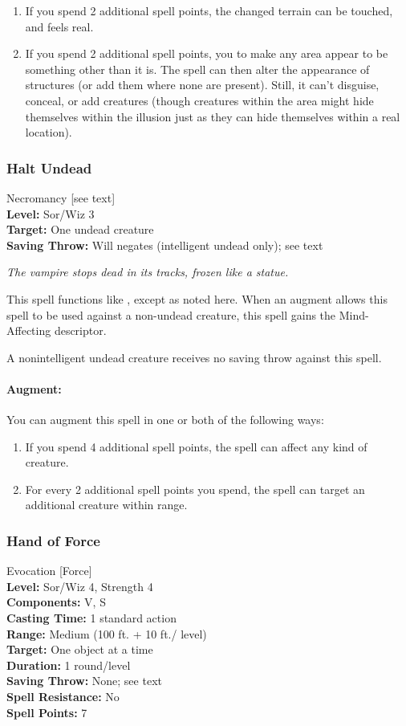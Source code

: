 \begin{enumerate}
 \item If you spend 2 additional spell points, the changed terrain can be touched, and feels real.
 \item If you spend 2 additional spell points, you to make any area appear to be something other than it is. 
The spell can then alter the appearance of structures (or add them where none are present).
Still, it can't disguise, conceal, or add creatures 
(though creatures within the area might hide themselves within the illusion just as they can hide themselves within a real location).
\end{enumerate}
\subsubsection{Halt Undead}
\label{Spell:HaltUndead}
Necromancy [see text]
\\ \textbf{Level:} Sor/Wiz 3
\\ \textbf{Target:} One undead creature
\\ \textbf{Saving Throw:} Will negates (intelligent undead only); see text

\emph{The vampire stops dead in its tracks, frozen like a statue.}

This spell functions like , except as noted here.
When an augment allows this spell to be used against a non-undead creature, this spell gains the Mind-Affecting descriptor.

A nonintelligent undead creature receives no saving throw against this spell.

\paragraph{Augment:} You can augment this spell in one or both of the following ways:
\begin{enumerate}
 \item If you spend 4 additional spell points, the spell can affect any kind of creature.
 \item For every 2 additional spell points you spend, the spell can target an additional creature within range.
\end{enumerate}
\subsubsection{Hand of Force}
\label{Spell:HandOfForce}
Evocation [Force]
\\ \textbf{Level:} Sor/Wiz 4, Strength 4
\\ \textbf{Components:} V, S
\\ \textbf{Casting Time:} 1 standard action
\\ \textbf{Range:} Medium (100 ft. + 10 ft./ level)
\\ \textbf{Target:} One object at a time
\\ \textbf{Duration:} 1 round/level
\\ \textbf{Saving Throw:} None; see text
\\ \textbf{Spell Resistance:} No
\\ \textbf{Spell Points:} 7

